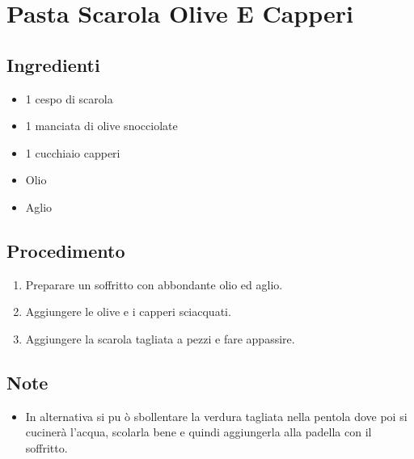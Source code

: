 \section{Pasta Scarola Olive E Capperi}
\subsection{Ingredienti}
\begin{itemize}
\item 1 cespo di scarola  
\item 1 manciata di olive snocciolate  
\item 1 cucchiaio capperi  
\item Olio  
\item Aglio
\end{itemize}
\subsection{Procedimento}
\begin{enumerate}
\item  Preparare un soffritto con abbondante olio ed aglio.   
\item  Aggiungere le olive e i capperi sciacquati.  
\item  Aggiungere la scarola tagliata a pezzi e fare appassire.
\end{enumerate}
\subsection{Note}
\begin{itemize}
\item In alternativa si pu ò sbollentare la verdura tagliata nella pentola dove poi si cucinerà l'acqua, scolarla bene e quindi aggiungerla alla padella con il soffritto.
\end{itemize}
